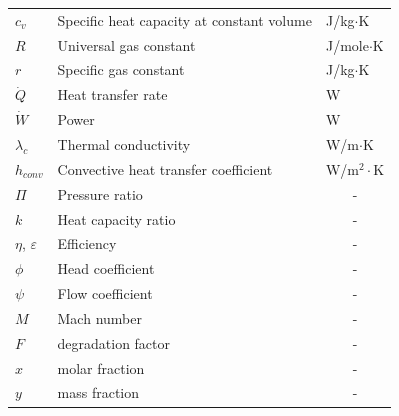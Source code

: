 \documentclass[12pt,a4paper]{report}
\begin{document}
\begin{longtable}[c]{lll}
$c_v$        & Specific heat capacity at constant volume   & J/kg$\cdot$K   \\
$R$          & Universal gas constant                      & J/mole$\cdot$K \\
$r$          & Specific gas constant                       & J/kg$\cdot$K   \\
$\dot{Q}$    & Heat transfer rate                          & W              \\
$\dot{W}$    & Power                                       & W              \\
$\lambda_c$  & Thermal conductivity                        & W/m$\cdot$K    \\
$h_{conv}$   & Convective heat transfer coefficient        &  W/m$^2\cdot$K \\
$\Pi$        & Pressure ratio                              & \multicolumn{1}{c}{-} \\
$k$          & Heat capacity ratio                         & \multicolumn{1}{c}{-} \\
$\eta$, $\varepsilon$       & Efficiency                   & \multicolumn{1}{c}{-} \\
$\phi$ & Head coefficient                                  & \multicolumn{1}{c}{-} \\
$\psi$ & Flow coefficient                                  & \multicolumn{1}{c}{-} \\
$M$ & Mach number                                          & \multicolumn{1}{c}{-} \\ 
$F$ & degradation factor                                   & \multicolumn{1}{c}{-} \\
$x$ & molar fraction                                       & \multicolumn{1}{c}{-} \\
$y$ & mass fraction                                        & \multicolumn{1}{c}{-} \\

\end{longtable}
\endgroup
\end{document}
